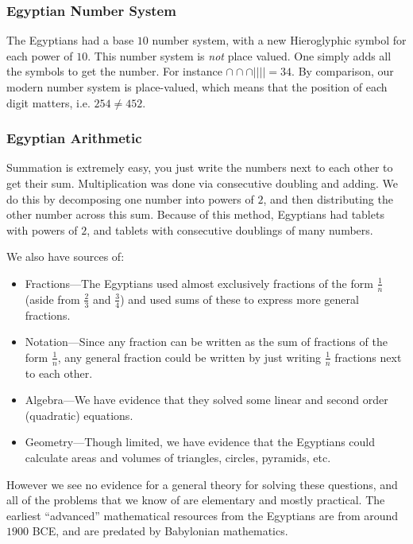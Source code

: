 \documentclass[class=article, crop=false]{standalone}
\begin{document}
  \subsubsection{Egyptian Number System}
  The Egyptians had a base $10$ number system, with a new Hieroglyphic symbol for each power of $10$. This number system is \emph{not} place valued. One simply adds all the symbols to get the number. For instance $\cap\cap\cap|||| = 34$. By comparison, our modern number system is place-valued, which means that the position of each digit matters, i.e. $254 \neq 452$.
  \subsubsection{Egyptian Arithmetic}
  Summation is extremely easy, you just write the numbers next to each other to get their sum. Multiplication was done via consecutive doubling and adding. We do this by decomposing one number into powers of $2$, and then distributing the other number across this sum. Because of this method, Egyptians had tablets with powers of $2$, and tablets with consecutive doublings of many numbers. \par
  We also have sources of:
  \begin{itemize}
    \item Fractions---The Egyptians used almost exclusively fractions of the form $\frac{1}{n}$ (aside from $\frac{2}{3}$ and $\frac{3}{4}$) and used sums of these to express more general fractions.
    \item Notation---Since any fraction can be written as the sum of fractions of the form $\frac{1}{n}$, any general fraction could be written by just writing $\frac{1}{n}$ fractions next to each other.
    \item Algebra---We have evidence that they solved some linear and second order (quadratic) equations.
    \item Geometry---Though limited, we have evidence that the Egyptians could calculate areas and volumes of triangles, circles, pyramids, etc.
  \end{itemize}
  However we see no evidence for a general theory for solving these questions, and all of the problems that we know of are elementary and mostly practical. The earliest ``advanced'' mathematical resources from the Egyptians are from around $1900$ BCE, and are predated by Babylonian mathematics.
\end{document}
